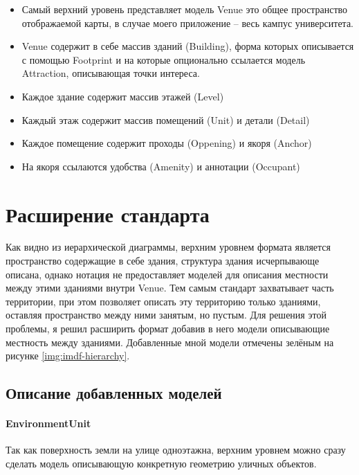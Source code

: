       \begin{itemize}
        \item Самый верхний уровень представляет модель Venue это общее пространство отображаемой карты, в случае моего приложение -- весь кампус университета.
        \item Venue содержит в себе массив зданий (Building), форма которых описывается с помощью Footprint и на которые опционально ссылается модель Attraction, описывающая точки интереса.
        \item Каждое здание содержит массив этажей (Level)
        \item Каждый этаж содержит массив помещений (Unit) и детали (Detail)
        \item Каждое помещение содержит проходы (Oppening) и якоря (Anchor)
        \item На якоря ссылаются удобства (Amenity) и аннотации (Occupant)
      \end{itemize}

  \section{Расширение стандарта}
    Как видно из иерархической диаграммы, верхним уровнем формата является пространство содержащие в себе здания, структура здания исчерпывающе описана, однако нотация не предоставляет моделей для описания местности между этими зданиями внутри Venue. Тем самым стандарт захватывает часть территории, при этом позволяет описать эту территорию только зданиями, оставляя пространство между ними занятым, но пустым.
    Для решения этой проблемы, я решил расширить формат добавив в него модели описывающие местность между зданиями. Добавленные мной модели отмечены зелёным на рисунке \ref{img:imdf-hierarchy}.

    \subsection{Описание добавленных моделей}
      \paragraph{EnvironmentUnit}
        Так как поверхность земли на улице одноэтажна, верхним уровнем можно сразу сделать модель описывающую конкретную геометрию уличных объектов.

